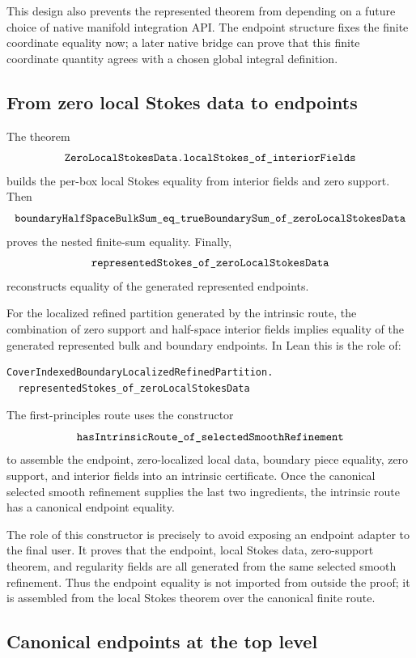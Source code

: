 This design also prevents the represented theorem from depending on a future
choice of native manifold integration API.  The endpoint structure fixes the
finite coordinate equality now; a later native bridge can prove that this
finite coordinate quantity agrees with a chosen global integral definition.

\subsection{From zero local Stokes data to endpoints}

The theorem
\[
\code{ZeroLocalStokesData.localStokes_of_interiorFields}
\]
builds the per-box local Stokes equality from interior fields and zero support.
Then
\[
\code{boundaryHalfSpaceBulkSum_eq_trueBoundarySum_of_zeroLocalStokesData}
\]
proves the nested finite-sum equality.  Finally,
\[
\code{representedStokes_of_zeroLocalStokesData}
\]
reconstructs equality of the generated represented endpoints.

\begin{theorem}
For the localized refined partition generated by the intrinsic route, the
combination of zero support and half-space interior fields implies equality of
the generated represented bulk and boundary endpoints.  In Lean this is the
role of:
\begin{lstlisting}[language=Lean]
CoverIndexedBoundaryLocalizedRefinedPartition.
  representedStokes_of_zeroLocalStokesData
\end{lstlisting}
\end{theorem}

The first-principles route uses the constructor
\[
\code{hasIntrinsicRoute_of_selectedSmoothRefinement}
\]
to assemble the endpoint, zero-localized local data, boundary piece equality,
zero support, and interior fields into an intrinsic certificate.  Once the
canonical selected smooth refinement supplies the last two ingredients, the
intrinsic route has a canonical endpoint equality.

The role of this constructor is precisely to avoid exposing an endpoint
adapter to the final user.  It proves that the endpoint, local Stokes data,
zero-support theorem, and regularity fields are all generated from the same
selected smooth refinement.  Thus the endpoint equality is not imported from
outside the proof; it is assembled from the local Stokes theorem over the
canonical finite route.

\subsection{Canonical endpoints at the top level}

